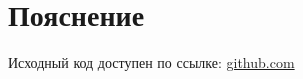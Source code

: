 \documentclass{article} %
\begin{document}
%
%
%
% 
%

\section{Пояснение}
Исходный код доступен по ссылке:
\href{https://github.com/SvichkarevAnatoly/Course-Python-Bioinformatics/tree/master/semester2/task5}
{github.com}
\end{document}
